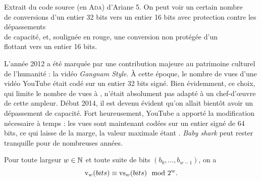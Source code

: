 \documentclass{magnolia}
\begin{document}
\begin{remarques}
\begin{center}
    Extrait du code source (en \textsc{Ada}) d'Ariane 5. On peut voir
      un certain nombre\\ de conversions d'un entier 32 bits
      vers un entier 16 bits
      avec protection contre les dépassements\\ de
      capacité, et, soulignée en rouge, une conversion  non protégée d'un\\ flottant vers
      un entier 16 bits.
  \end{center}
  \remarque
    L'année 2012 a été marquée par une contribution majeure au patrimoine
    culturel de l'humanité : la vidéo \emph{Gangnam Style}. À cette
    époque, le nombre de vues d'une vidéo YouTube était codé 
    sur un entier 32 bits signé.
    Bien évidemment, ce choix, qui limite le nombre de vues à
    , n'était absolument pas adapté à un
    chef-d'œuvre de cette ampleur. Début 2014, il est devenu évident
    qu'on allait bientôt avoir un dépassement de capacité. Fort heureusement,
    YouTube a apporté la modification nécessaire à temps : les vues sont
    maintenant codées sur un entier signé de 64 bits, ce qui laisse de la marge, la valeur maximale étant
    . \emph{Baby shark} peut rester
    tranquille pour de nombreuses années.
  \end{remarques}

\begin{proposition}
  Pour toute largeur $w\in\mathbb{N}$ et toute suite de bits $(b_0, \ldots, b_{w-1})$, on a
  \begin{displaymath}
    {\rm v}_{w}(bits) \equiv {\rm vs}_{w}(bits) \mod{2^{w}}.
  \end{displaymath}
\end{proposition}
\end{document}

